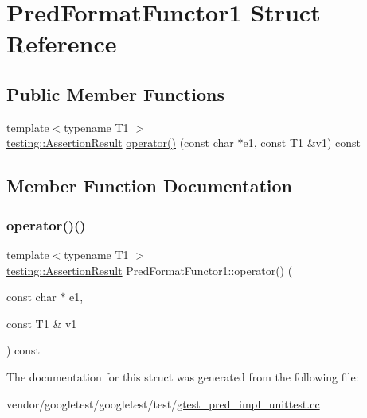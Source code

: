 \hypertarget{struct_pred_format_functor1}{}\section{Pred\+Format\+Functor1 Struct Reference}
\label{struct_pred_format_functor1}
\subsection*{Public Member Functions}
\begin{DoxyCompactItemize}
\item 
{\footnotesize template$<$typename T1 $>$ }\\\hyperlink{classtesting_1_1_assertion_result}{testing\+::\+Assertion\+Result} \hyperlink{struct_pred_format_functor1_ac2c414b5fa65b41b0ab5967f9f1e5bff}{operator()} (const char $\ast$e1, const T1 \&v1) const
\end{DoxyCompactItemize}


\subsection{Member Function Documentation}
\mbox{\label{struct_pred_format_functor1_ac2c414b5fa65b41b0ab5967f9f1e5bff}} 
\subsubsection{\texorpdfstring{operator()()}{operator()()}}
{\footnotesize\ttfamily template$<$typename T1 $>$ \\
\hyperlink{classtesting_1_1_assertion_result}{testing\+::\+Assertion\+Result} Pred\+Format\+Functor1\+::operator() (\begin{DoxyParamCaption}\item[{const char $\ast$}]{e1,  }\item[{const T1 \&}]{v1 }\end{DoxyParamCaption}) const\hspace{0.3cm}{\ttfamily [inline]}}



The documentation for this struct was generated from the following file\+:\begin{DoxyCompactItemize}
\item 
vendor/googletest/googletest/test/\hyperlink{gtest__pred__impl__unittest_8cc}{gtest\+\_\+pred\+\_\+impl\+\_\+unittest.\+cc}\end{DoxyCompactItemize}
